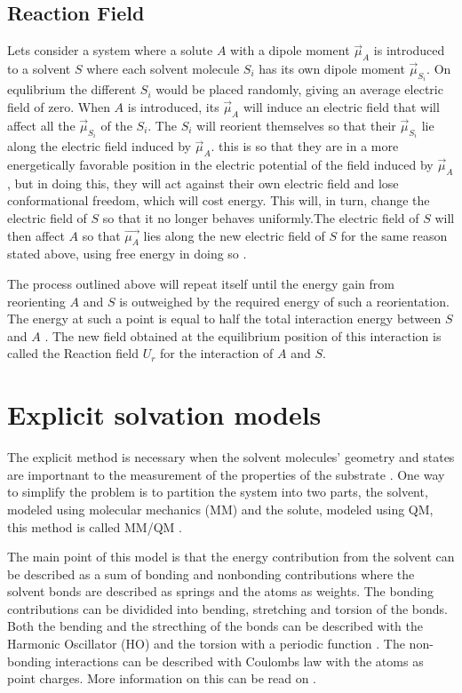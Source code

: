 \documentclass[../master_thesis.tex]{subfiles}
\begin{document}
\subsection{Reaction Field}\label{Reaction_field}
Lets consider a system where a solute $A$ with a dipole moment $\vec{\mu}_A$ is
introduced to a solvent $S$ where each solvent molecule $S_i$ has its own dipole
moment $\vec{\mu}_{S_i}$. On equlibrium the different $S_i$  would be placed
randomly, giving an average electric field of zero. When $A$ is introduced, its
$\vec{\mu}_A$ will induce an electric field that will affect all the
$\vec{\mu}_{S_i}$ of the $S_i$. The $S_i$ will reorient themselves so that their
$\vec{\mu}_{S_i}$ lie along the electric field induced by $\vec{\mu}_A$. this is
so that they are in a more energetically favorable position in the electric
potential of the field induced by $\vec{\mu}_A$, but in doing this, they will
act against their own electric field and lose conformational freedom, which will
cost energy. This will, in turn, change the electric field of $S$ so that it no
longer behaves uniformly.The electric field of $S$ will then affect $A$ so that
$\vec{\mu_A}$ lies along the new electric field of $S$ for the same reason
stated above, using free energy in doing so \cite{Cramer:2004}.

The process outlined above will repeat itself until the energy gain from
reorienting $A$ and $S$ is outweighed by the required energy of such a
reorientation. The energy at such a point is equal to half the total interaction
energy between $S$ and $A$ \cite{Cramer:2004}. The new field obtained at the
equilibrium position of this interaction is called the Reaction field $U_r$ for
the interaction of $A$ and $S$.

\section{Explicit solvation models}

The explicit method is necessary when the solvent molecules' geometry and states
are importnant to the measurement of the properties of the substrate
\cite{Cramer:2004}.
One way to simplify the problem is to partition the system into two parts, the
solvent, modeled using molecular mechanics (MM) and the solute, modeled using
\ac{QM}, this method is called MM/QM \cite{Mennucci:2018}.

The main point of this model is that the energy contribution from the solvent
can be described as a sum of bonding and nonbonding contributions
\cite{Cramer:2004} where the solvent bonds are described as springs
\cite{Mennucci:2018} and the atoms as weights. The bonding contributions can be
dividided into bending, stretching and torsion of the bonds. Both the bending
and the strecthing of the bonds can be described with the Harmonic Oscillator
(HO) and the torsion with a periodic function \cite{Mennucci:2018}. The
non-bonding interactions can be described with Coulombs law with the atoms as
point charges. More information on this can be read on \cite{Cramer:2004,
Jensen:2017}.
\end{document}
